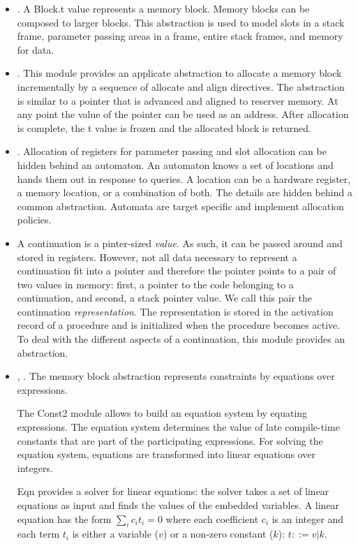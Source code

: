 \documentclass{article}%
\begin{document}
\begin{itemize}

\item {}. A {\Tt{}Block.t\nwendquote} value represents a memory
block. Memory blocks can be composed to larger blocks. This abstraction
is used to model slots in a stack frame, parameter passing areas in a
frame, entire stack frames, and memory for data.

\item {}.  This module provides an applicate
abstraction to allocate a memory block incrementally by a sequence of
{\Tt{}allocate\nwendquote} and {\Tt{}align\nwendquote} directives.  The abstraction is similar to a
pointer that is advanced and aligned to reserver memory. At any point
the value of the  pointer can be used as an address. After allocation
is complete, the {\Tt{}t\nwendquote} value is {\Tt{}frozen\nwendquote} and the allocated block is
returned. 

\item {}. Allocation of registers for parameter
passing and slot allocation can be hidden behind an automaton. An
automaton knows a set of locations and hands them out in response to
queries. A location can be a hardware register, a memory location, or a
combination of both. The details are hidden behind a common abstraction.
Automata are target specific and implement allocation policies.

\item {} A continuation is a pinter-sized {\PAL}
\emph{value}. As such, it can be passed around and stored in registers.
However, not all data necessary to represent a continuation fit into a
pointer and therefore the pointer points to a pair of two values in
memory: first, a pointer to the code belonging to a continuation, and
second, a stack pointer value. We call this pair the continuation
\emph{representation}. The representation is stored in the activation
record of a procedure and is initialized when the procedure becomes
active.  To deal with the different aspects of a continuation, this
module provides an abstraction.

\item {}, . The memory block
abstraction  represents constraints by equations over {\rtl}
expressions. 

The {\Tt{}Const2\nwendquote} module allows to build an equation system by equating
{\rtl} expressions.  The equation system determines the value of late
compile-time constants that are part of the participating expressions.
For solving the equation system, equations are transformed into linear
equations over integers.

{\Tt{}Eqn\nwendquote} provides a solver for linear equations: the solver takes a set
of linear equations as input and finds the values of the embedded
variables. A linear equation has the form $\sum_{i} c_i t_i = 0$ where
each coefficient $c_i$ is an integer and each term $t_i$ is either a
variable ($v$) or a non-zero constant ($k$): $t ::= v | k$.

\end{itemize}
\end{document}

